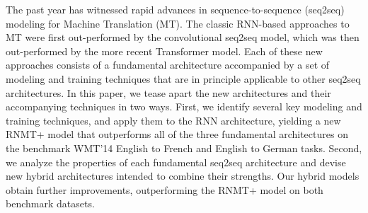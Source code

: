 The past year has witnessed rapid advances in sequence-to-sequence (seq2seq) modeling for Machine Translation (MT). The classic RNN-based approaches to MT were first out-performed by the convolutional seq2seq model, which was then out-performed by the more recent Transformer model. Each of these new approaches consists of a fundamental architecture accompanied by a set of modeling and training techniques that are in principle applicable to other seq2seq architectures. In this paper, we tease apart the new architectures and their accompanying techniques in two ways. First, we identify several key modeling and training techniques, and apply them to the RNN architecture, yielding a new RNMT+ model that outperforms all of the three fundamental architectures on the benchmark WMT'14 English to French and English to German tasks. Second, we analyze the properties of each fundamental seq2seq architecture and devise new hybrid architectures intended to combine their strengths. Our hybrid models obtain further improvements, outperforming the RNMT+ model on both benchmark datasets.
